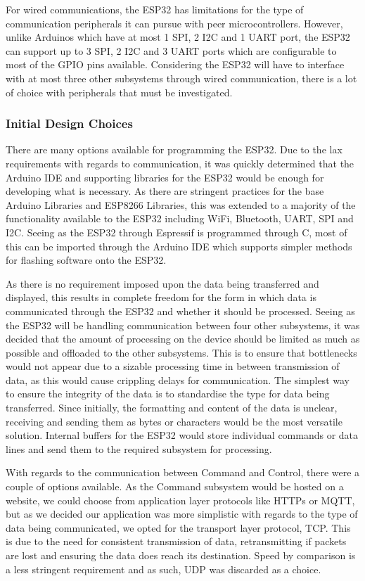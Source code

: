 \documentclass[a4paper]{article}
\begin{document}
For wired communications, the ESP32 has limitations for the type of 
communication peripherals it can pursue with peer microcontrollers. 
However, unlike Arduinos which have at most 1 SPI, 2 I2C and 1 UART port, 
the ESP32 can support up to 3 SPI, 2 I2C and 3 UART ports which are 
configurable to most of the GPIO pins available. Considering the ESP32 
will have to interface with at most three other subsystems through wired 
communication, there is a lot of choice with peripherals that must be 
investigated.

\subsubsection{Initial Design Choices} 

There are many options available for programming the ESP32. Due to the 
lax requirements with regards to communication, it was quickly determined 
that the Arduino IDE and supporting libraries for the ESP32 would be 
enough for developing what is necessary. As there are stringent practices 
for the base Arduino Libraries and ESP8266 Libraries, this was extended 
to a majority of the functionality available to the ESP32 including WiFi, 
Bluetooth, UART, SPI and I2C. Seeing as the ESP32 through Espressif is 
programmed through C, most of this can be imported through the Arduino IDE 
which supports simpler methods for flashing software onto the ESP32.

As there is no requirement imposed upon the data being transferred 
and displayed, this results in complete freedom for the form in which 
data is communicated through the ESP32 and whether it should be processed. 
Seeing as the ESP32 will be handling communication between four other 
subsystems, it was decided that the amount of processing on the device 
should be limited as much as possible and offloaded to the other 
subsystems. This is to ensure that bottlenecks would not appear due to a 
sizable processing time in between transmission of data, as this would 
cause crippling delays for communication. The simplest way to ensure the 
integrity of the data is to standardise the type for data being 
transferred. Since initially, the formatting and content of the data is 
unclear, receiving and sending them as bytes or characters would be the 
most versatile solution. Internal buffers for the ESP32 would store 
individual commands or data lines and send them to the required subsystem 
for processing.

With regards to the communication between Command and Control, 
there were a couple of options available. As the Command subsystem 
would be hosted on a website, we could choose from application layer 
protocols like HTTPs or MQTT, but as we decided our application was 
more simplistic with regards to the type of data being communicated, we 
opted for the transport layer protocol, TCP. This is due to the need for 
consistent transmission of data, retransmitting if packets are lost and 
ensuring the data does reach its destination. Speed by comparison is a 
less stringent requirement and as such, UDP was discarded as a choice.
\end{document}

